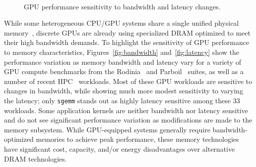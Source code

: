 \begin{figure}[t]
    \\
    \caption{GPU performance sensitivity to bandwidth and latency changes.}
    \label{fig:bwlatencysensitivity}
\end{figure}

While some heterogeneous CPU/GPU systems share a single unified physical memory~\cite{AMDAPU},
discrete GPUs are already using specialized DRAM optimized to meet their high bandwidth demands.  
To highlight the sensitivity of GPU performance to memory characteristics, Figures~\ref{fig:bandwidth} and~\ref{fig:latency} show the
performance variation as memory bandwidth and latency vary for a variety of GPU compute benchmarks from the
Rodinia~\cite{Che2009} and {\color{black}Parboil~\cite{Parboil} suites, as well as a number of recent HPC~\cite{comd,cns,minife,xsbench}
workloads. Most of these GPU workloads are
sensitive to changes in bandwidth, while showing much more modest
sensitivity to varying the latency; only {\tt sgemm} stands
out as highly latency sensitive among these 33 workloads. Some application kernels are
neither bandwidth nor latency sensitive and do not see significant performance variation
as modifications are made to the memory subsystem.} While GPU-equipped systems generally require bandwidth-optimized memories to achieve peak performance,
these memory technologies have significant cost, capacity, and/or energy disadvantages over alternative DRAM technologies.

